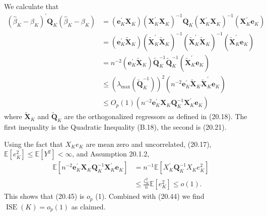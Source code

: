 \documentclass[10pt]{article}
\begin{document}
We calculate that
$$
\begin{aligned}
\left(\widehat{\beta}_{K}-\beta_{K}\right)^{\prime} \boldsymbol{Q}_{K}\left(\widehat{\beta}_{K}-\beta_{K}\right) &=\left(\boldsymbol{e}_{K}^{\prime} \boldsymbol{X}_{K}\right)\left(\boldsymbol{X}_{K}^{\prime} \boldsymbol{X}_{K}\right)^{-1} \boldsymbol{Q}_{K}\left(\boldsymbol{X}_{K}^{\prime} \boldsymbol{X}_{K}\right)^{-1}\left(\boldsymbol{X}_{K}^{\prime} \boldsymbol{e}_{K}\right) \\
&=\left(\boldsymbol{e}_{K}^{\prime} \widetilde{\boldsymbol{X}}_{K}\right)\left(\widetilde{\boldsymbol{X}}_{K}^{\prime} \widetilde{\boldsymbol{X}}_{K}\right)^{-1}\left(\widetilde{\boldsymbol{X}}_{K}^{\prime} \widetilde{\boldsymbol{X}}_{K}\right)^{-1}\left(\widetilde{\boldsymbol{X}}_{K}^{\prime} \boldsymbol{e}_{K}\right) \\
&=n^{-2}\left(\boldsymbol{e}_{K}^{\prime} \widetilde{\boldsymbol{X}}_{K}\right) \widetilde{\boldsymbol{Q}}_{K}^{-1} \widetilde{\boldsymbol{Q}}_{K}^{-1}\left(\widetilde{\boldsymbol{X}}_{K}^{\prime} \boldsymbol{e}_{K}\right) \\
& \leq\left(\lambda_{\max }\left(\widetilde{\boldsymbol{Q}}_{K}^{-1}\right)\right)^{2}\left(n^{-2} \boldsymbol{e}_{K}^{\prime} \widetilde{\boldsymbol{X}}_{K} \widetilde{\boldsymbol{X}}_{K}^{\prime} \boldsymbol{e}_{K}\right) \\
& \leq O_{p}(1)\left(n^{-2} \boldsymbol{e}_{K}^{\prime} \boldsymbol{X}_{K} \boldsymbol{Q}_{K}^{-1} \boldsymbol{X}_{K}^{\prime} \boldsymbol{e}_{K}\right)
\end{aligned}
$$
where $\widetilde{\boldsymbol{X}}_{K}$ and $\widetilde{\boldsymbol{Q}}_{K}$ are the orthogonalized regressors as defined in (20.18). The first inequality is the Quadratic Inequality (B.18), the second is (20.21).

Using the fact that $X_{K} e_{K}$ are mean zero and uncorrelated, (20.17), $\mathbb{E}\left[e_{K}^{2}\right] \leq \mathbb{E}\left[Y^{2}\right]<\infty$, and Assumption 20.1.2,
$$
\begin{aligned}
\mathbb{E}\left[n^{-2} \boldsymbol{e}_{K}^{\prime} \boldsymbol{X}_{K} \boldsymbol{Q}_{K}^{-1} \boldsymbol{X}_{K}^{\prime} \boldsymbol{e}_{K}\right] &=n^{-1} \mathbb{E}\left[X_{K}^{\prime} \boldsymbol{Q}_{K}^{-1} X_{K} e_{K}^{2}\right] \\
& \leq \frac{\zeta_{K}^{2}}{n} \mathbb{E}\left[e_{K}^{2}\right] \leq o(1) .
\end{aligned}
$$
This shows that (20.45) is $o_{p}$ (1). Combined with (20.44) we find $\operatorname{ISE}(K)=o_{p}(1)$ as claimed.
\end{document}
